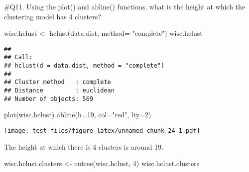 \documentclass[
]{article}
\newenvironment{Shaded}{\begin{snugshade}}{\end{snugshade}}
\newcommand{\AttributeTok}[1]{\textcolor[rgb]{0.77,0.63,0.00}{#1}}
\newcommand{\DecValTok}[1]{\textcolor[rgb]{0.00,0.00,0.81}{#1}}
\newcommand{\FunctionTok}[1]{\textcolor[rgb]{0.00,0.00,0.00}{#1}}
\newcommand{\NormalTok}[1]{#1}
\newcommand{\OtherTok}[1]{\textcolor[rgb]{0.56,0.35,0.01}{#1}}
\newcommand{\StringTok}[1]{\textcolor[rgb]{0.31,0.60,0.02}{#1}}
\begin{document}
\#Q11. Using the plot() and abline() functions, what is the height at
which the clustering model has 4 clusters?

\begin{Shaded}
\begin{Highlighting}[]
\NormalTok{wisc.hclust }\OtherTok{\textless{}{-}} \FunctionTok{hclust}\NormalTok{(data.dist, }\AttributeTok{method=} \StringTok{"complete"}\NormalTok{)}
\NormalTok{wisc.hclust}
\end{Highlighting}
\end{Shaded}

\begin{verbatim}
## 
## Call:
## hclust(d = data.dist, method = "complete")
## 
## Cluster method   : complete 
## Distance         : euclidean 
## Number of objects: 569
\end{verbatim}

\begin{Shaded}
\begin{Highlighting}[]
\FunctionTok{plot}\NormalTok{(wisc.hclust)}
\FunctionTok{abline}\NormalTok{(}\AttributeTok{h=}\DecValTok{19}\NormalTok{, }\AttributeTok{col=}\StringTok{"red"}\NormalTok{, }\AttributeTok{lty=}\DecValTok{2}\NormalTok{)}
\end{Highlighting}
\end{Shaded}

\texttt{[image: test\_files/figure-latex/unnamed-chunk-24-1.pdf]}

The height at which there is 4 clusters is around 19.

\begin{Shaded}
\begin{Highlighting}[]
\NormalTok{wisc.hclust.clusters }\OtherTok{\textless{}{-}} \FunctionTok{cutree}\NormalTok{(wisc.hclust, }\DecValTok{4}\NormalTok{)}
\NormalTok{wisc.hclust.clusters}
\end{Highlighting}
\end{Shaded}
\end{document}
